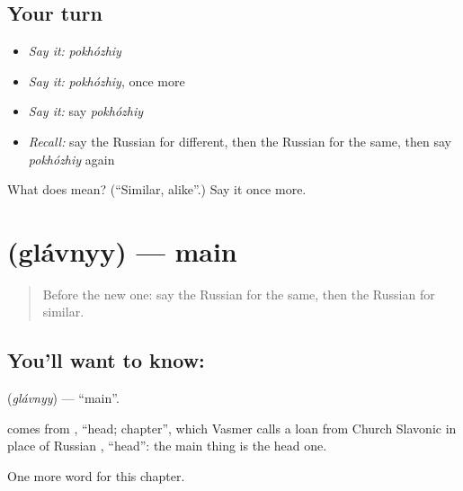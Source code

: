 \subsection*{Your turn}
\begin{itemize}
\raggedright
  \item \emph{Say it:} \emph{pokhózhiy}
  \item \emph{Say it:} \emph{pokhózhiy}, once more
  \item \emph{Say it:} say \emph{pokhózhiy}
  \item \emph{Recall:} say the Russian for different, then the Russian for the same, then say \emph{pokhózhiy} again
\end{itemize}

\begin{tcolorbox}[breakable,colback=teal!4,colframe=teal!35!black,title={Before you move on}]
What does  mean? (\textquotedblleft{}Similar, alike\textquotedblright{}.) Say it once more.
\end{tcolorbox}
\section[\texorpdfstring{\ru{главный} (glávnyy)}{главный (glávnyy)}]{ (glávnyy) — main}

\label{lesson:RU-C218-glavnyy}



\begin{quote}
Before the new one: say the Russian for the same, then the Russian for similar.
\end{quote}

\subsection*{You'll want to know: }
\textbf{} (\emph{glávnyy}) — \textquotedblleft{}main\textquotedblright{}.

\begin{cousinweb}
\textbf{} comes from \emph{}, \textquotedblleft{}head; chapter\textquotedblright{}, which Vasmer calls a loan from Church Slavonic in place of Russian \emph{}, \textquotedblleft{}head\textquotedblright{}: the main thing is the head one.
\end{cousinweb}

\begin{grammarlens}[title={What you've built}]
One more word for this chapter.
\end{grammarlens}

